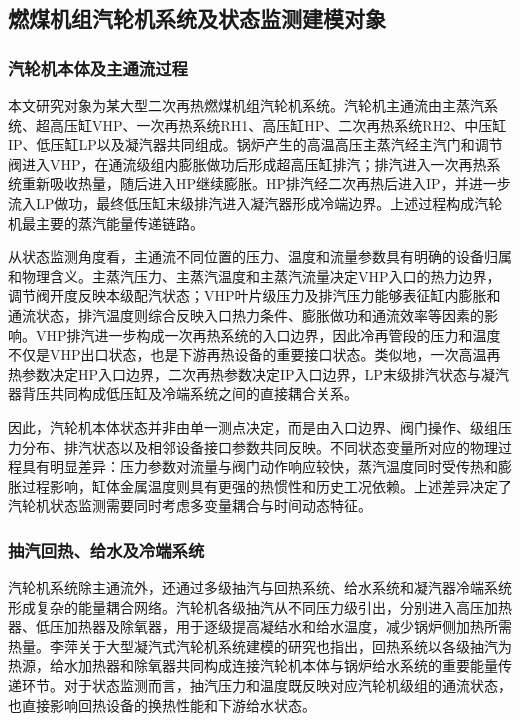 \subsection{燃煤机组汽轮机系统及状态监测建模对象}
\label{subsec:turbine_system_and_objects}

\subsubsection{汽轮机本体及主通流过程}

本文研究对象为某大型二次再热燃煤机组汽轮机系统。汽轮机主通流由主蒸汽系统、超高压缸VHP、一次再热系统RH1、高压缸HP、二次再热系统RH2、中压缸IP、低压缸LP以及凝汽器共同组成。锅炉产生的高温高压主蒸汽经主汽门和调节阀进入VHP，在通流级组内膨胀做功后形成超高压缸排汽；排汽进入一次再热系统重新吸收热量，随后进入HP继续膨胀。HP排汽经二次再热后进入IP，并进一步流入LP做功，最终低压缸末级排汽进入凝汽器形成冷端边界。上述过程构成汽轮机最主要的蒸汽能量传递链路。

从状态监测角度看，主通流不同位置的压力、温度和流量参数具有明确的设备归属和物理含义。主蒸汽压力、主蒸汽温度和主蒸汽流量决定VHP入口的热力边界，调节阀开度反映本级配汽状态；VHP叶片级压力及排汽压力能够表征缸内膨胀和通流状态，排汽温度则综合反映入口热力条件、膨胀做功和通流效率等因素的影响。VHP排汽进一步构成一次再热系统的入口边界，因此冷再管段的压力和温度不仅是VHP出口状态，也是下游再热设备的重要接口状态。类似地，一次高温再热参数决定HP入口边界，二次再热参数决定IP入口边界，LP末级排汽状态与凝汽器背压共同构成低压缸及冷端系统之间的直接耦合关系。

因此，汽轮机本体状态并非由单一测点决定，而是由入口边界、阀门操作、级组压力分布、排汽状态以及相邻设备接口参数共同反映。不同状态变量所对应的物理过程具有明显差异：压力参数对流量与阀门动作响应较快，蒸汽温度同时受传热和膨胀过程影响，缸体金属温度则具有更强的热惯性和历史工况依赖。上述差异决定了汽轮机状态监测需要同时考虑多变量耦合与时间动态特征。

\subsubsection{抽汽回热、给水及冷端系统}

汽轮机系统除主通流外，还通过多级抽汽与回热系统、给水系统和凝汽器冷端系统形成复杂的能量耦合网络。汽轮机各级抽汽从不同压力级引出，分别进入高压加热器、低压加热器及除氧器，用于逐级提高凝结水和给水温度，减少锅炉侧加热所需热量。李萍关于大型凝汽式汽轮机系统建模的研究也指出，回热系统以各级抽汽为热源，给水加热器和除氧器共同构成连接汽轮机本体与锅炉给水系统的重要能量传递环节。对于状态监测而言，抽汽压力和温度既反映对应汽轮机级组的通流状态，也直接影响回热设备的换热性能和下游给水状态。

